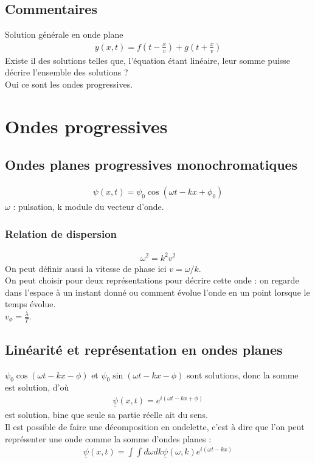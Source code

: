 \documentclass[12pt,prb,aps,epsf]{article}
\begin{document}
\subsection{Commentaires}
Solution générale en onde plane
\begin{eqnarray}
y(x,t) = f(t-\frac{x}{v}) +  g(t+\frac{x}{v}) 
\end{eqnarray}
Existe il des solutions telles que, l'équation étant linéaire, leur somme puisse décrire l'ensemble des solutions ?\\
Oui ce sont les ondes progressives.

\section{Ondes progressives}

\subsection{Ondes planes progressives monochromatiques}
\begin{eqnarray}
\psi(x,t) = \psi_0\cos(\omega t - kx +\phi_0)
\end{eqnarray}
$\omega$ : pulsation, k module du vecteur d'onde.\\
\subsubsection{Relation de dispersion}
\begin{eqnarray}
\omega^2 = k^2v^2
\end{eqnarray}
On peut définir aussi la vitesse de phase ici $v = \omega/k$.\\
On peut choisir pour deux représentations pour décrire cette onde : on regarde dans l'espace à un instant donné ou comment évolue l'onde en un point lorsque le temps évolue.\\
$v_{\phi} = \frac{\lambda}{T}$.

\subsection{Linéarité et représentation en ondes planes}
$\psi_0\cos(\omega t - kx - \phi)$ et $\psi_0\sin(\omega t - kx - \phi)$ sont solutions, donc la somme est solution, d'où 
\begin{eqnarray}
\underline{\psi}(x,t) = e^{i(\omega t - kx + \phi)}
\end{eqnarray}
est solution, bine que seule sa partie réelle ait du sens.\\
Il est possible de faire une décomposition en ondelette, c'est à dire que l'on peut représenter une onde comme la somme d'ondes planes :
\begin{eqnarray}
\underline{\psi}(x,t) = \int\int d\omega dk \underline \psi(\omega, k)e^{i(\omega t - kx)}
\end{eqnarray}
\end{document}
